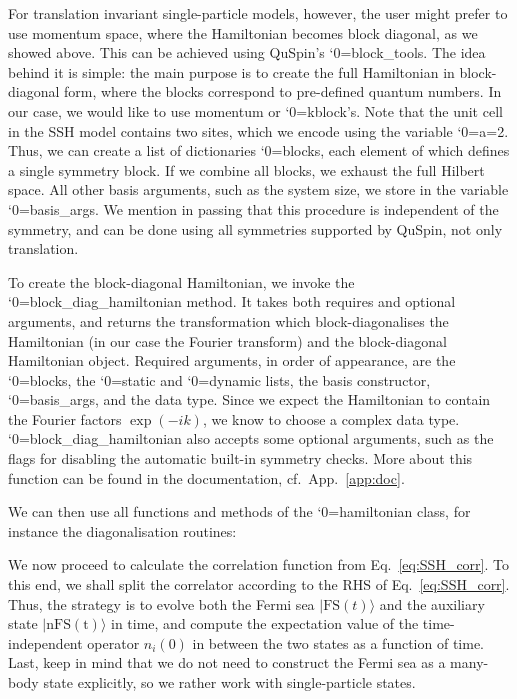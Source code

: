 \documentclass{SciPost}
\newcommand\0{\scalebox{-1}[1]{0}}
\let\svttfamily\ttfamily
\renewcommand\ttfamily{\svttfamily\catcode`0=\active }
\renewcommand\texttt{\bgroup\ttfamily\texttthelp}
\def\texttthelp#1{#1\egroup}
\newcommand{\SSHcode}{example5.py}
\begin{document}
For translation invariant single-particle models, however, the user might prefer to use momentum space, where the Hamiltonian becomes block diagonal, as we showed above. This can be achieved using QuSpin's \texttt{block\_tools}. The idea behind it is simple: the main purpose is to create the full Hamiltonian in block-diagonal form, where the blocks correspond to pre-defined quantum numbers. In our case, we would like to use momentum or \texttt{kblock}'s. Note that the unit cell in the SSH model contains two sites, which we encode using the variable \texttt{a=2}. Thus, we can create a list of dictionaries \texttt{blocks}, each element of which defines a single symmetry block. If we combine all blocks, we exhaust the full Hilbert space. All other basis arguments, such as the system size, we store in the variable \texttt{basis\_args}. We mention in passing that this procedure is independent of the symmetry, and can be done using all symmetries supported by QuSpin, not only translation.

To create the block-diagonal Hamiltonian, we invoke the \texttt{block\_diag\_hamiltonian} method. It takes both requires and optional arguments, and returns the transformation which block-diagonalises the Hamiltonian (in our case the Fourier transform) and the block-diagonal Hamiltonian object. Required arguments, in order of appearance, are the \texttt{blocks}, the \texttt{static} and \texttt{dynamic} lists, the basis constructor, \texttt{basis\_args}, and the data type. Since we expect the Hamiltonian to contain the Fourier factors $\exp(-ik)$, we know to choose a complex data type. \texttt{block\_diag\_hamiltonian} also accepts some optional arguments, such as the flags for disabling the automatic built-in symmetry checks. More about this function can be found in the documentation, cf.~App.~\ref{app:doc}.

We can then use all functions and methods of the \texttt{hamiltonian} class, for instance the diagonalisation routines:


We now proceed to calculate the correlation function from Eq.~\eqref{eq:SSH_corr}. To this end, we shall split the correlator according to the RHS of Eq.~\eqref{eq:SSH_corr}. Thus, the strategy is to evolve both the Fermi sea $|\mathrm{FS}(t)\rangle$ and the auxiliary state $|\mathrm{nFS(t)}\rangle$ in time, and compute the expectation value of the time-independent operator $n_i(0)$ in between the two states as a function of time. Last, keep in mind that we do not need to construct the Fermi sea as a many-body state explicitly, so we rather work with single-particle states.
\end{document}
